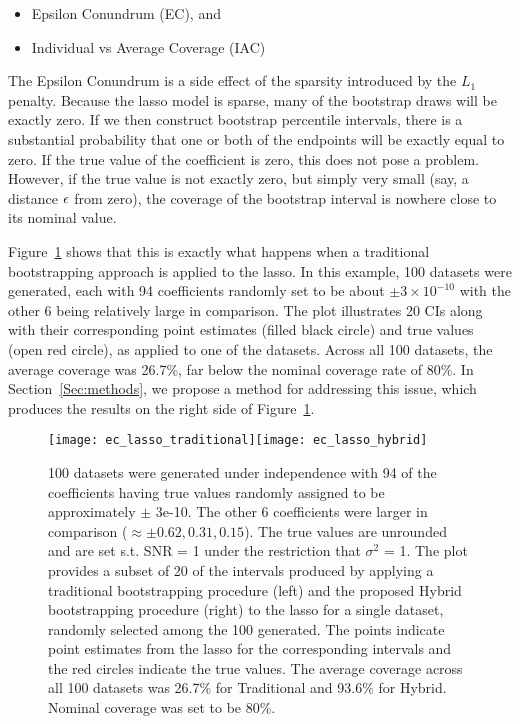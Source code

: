 \begin{itemize}
\item Epsilon Conundrum (EC), and
\item Individual vs Average Coverage (IAC)
\end{itemize}

The Epsilon Conundrum is a side effect of the sparsity introduced by the $L_1$ penalty. Because the lasso model is sparse, many of the bootstrap draws will be exactly zero. If we then construct bootstrap percentile intervals, there is a substantial probability that one or both of the endpoints will be exactly equal to zero. If the true value of the coefficient is zero, this does not pose a problem. However, if the true value is not exactly zero, but simply very small (say, a distance $\epsilon$ from zero), the coverage of the bootstrap interval is nowhere close to its nominal value.

Figure~\ref{Fig:ec} shows that this is exactly what happens when a traditional bootstrapping approach is applied to the lasso. In this example, 100 datasets were generated, each with 94 coefficients randomly set to be about $\pm 3 \times 10^{-10}$ with the other 6 being relatively large in comparison. The plot illustrates 20 CIs along with their corresponding point estimates (filled black circle) and true values (open red circle), as applied to one of the datasets. Across all 100 datasets, the average coverage was 26.7\%, far below the nominal coverage rate of 80\%. In Section~\ref{Sec:methods}, we propose a method for addressing this issue, which produces the results on the right side of Figure~\ref{Fig:ec}.

\begin{figure}[hbtp]
  \begin{center}
    \texttt{[image: ec\_lasso\_traditional]}\texttt{[image: ec\_lasso\_hybrid]}
    \caption{\label{Fig:ec} 100 datasets were generated under independence with 94 of the coefficients having true values randomly assigned to be approximately $\pm$ 3e-10. The other 6 coefficients were larger in comparison ($\approx \pm 0.62, 0.31, 0.15$). The true values are unrounded and are set s.t. SNR = 1 under the restriction that $\sigma^2$ = 1. The plot provides a subset of 20 of the intervals produced by applying a traditional bootstrapping procedure (left) and the proposed Hybrid bootstrapping procedure (right) to the lasso for a single dataset, randomly selected among the 100 generated. The points indicate point estimates from the lasso for the corresponding intervals and the red circles indicate the true values. The average coverage across all 100 datasets was 26.7\% for Traditional and 93.6\% for Hybrid. Nominal coverage was set to be 80\%.}
  \end{center}
\end{figure}

